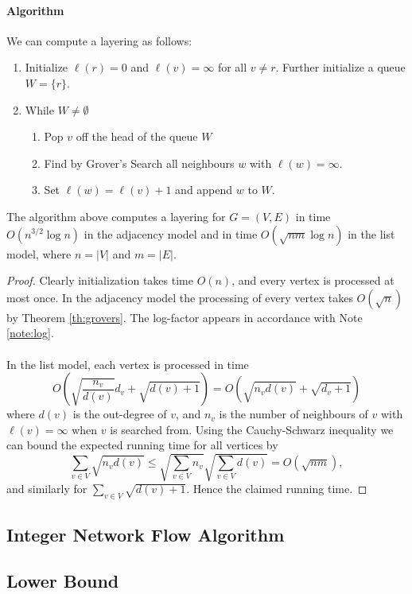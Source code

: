 \paragraph{Algorithm}
We can compute a layering as follows:
\begin{enumerate}
\item Initialize $\ell(r) = 0$ and $\ell(v) = \infty$ for all $v \neq r$. Further initialize a queue $W = \{r\}$.
\item While $W\neq \emptyset$
	\begin{enumerate}
	\item Pop $v$ off the head of the queue $W$
	\item Find by Grover's Search all neighbours $w$ with $\ell(w) = \infty$.
	\item Set $\ell(w) = \ell(v) + 1$ and append $w$ to $W$.
	\end{enumerate} 
\end{enumerate}
\begin{theorem}\label{th:layering}
The algorithm above computes a layering for $G=(V,E)$  in time $O(n^{3/2}\log n)$ in the adjacency model and in time $O(\sqrt{nm}\log n)$ in the list model, where $n = |V|$ and $m = |E|$.
\end{theorem}
\begin{proof}
Clearly initialization takes time $O(n)$, and every vertex is processed at most once. In the adjacency model the processing of every vertex takes $O(\sqrt{n})$ by Theorem \ref{th:grovers}. The log-factor appears in accordance with Note \ref{note:log}.
\paragraph{}
In the list model, each vertex is processed in time $$O(\sqrt{\frac{n_v}{d(v)}}d_v + \sqrt{d(v) + 1}) = O(\sqrt{n_vd(v)} + \sqrt{d_v + 1})$$ where $d(v)$ is the out-degree of $v$, and $n_v$ is the number of neighbours of $v$ with $\ell(v)=\infty$ when $v$ is searched from. Using the Cauchy-Schwarz inequality we can bound the expected running time for all vertices by
$$\sum_{v\in V} \sqrt{n_vd(v)} \leq \sqrt{\sum_{v\in V} n_v}\sqrt{\sum_{v \in V} d(v)} = O(\sqrt{nm}),$$
and similarly for $\sum_{v \in V} \sqrt{d(v) + 1}$. Hence the claimed running time.
\end{proof}
\subsection{Integer Network Flow Algorithm}

\subsection{Lower Bound}